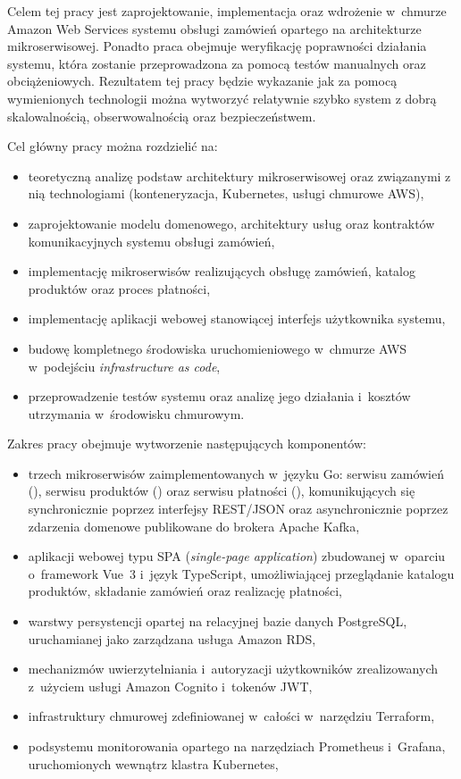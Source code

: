 Celem tej pracy jest zaprojektowanie, implementacja oraz wdrożenie w~chmurze Amazon Web Services systemu obsługi
zamówień opartego na architekturze mikroserwisowej. Ponadto praca obejmuje weryfikację
poprawności działania systemu, która zostanie przeprowadzona za pomocą testów manualnych oraz obciążeniowych. Rezultatem tej pracy będzie wykazanie jak za pomocą wymienionych technologii
można wytworzyć relatywnie szybko system z dobrą skalowalnością, obserwowalnością oraz bezpieczeństwem.

Cel główny pracy można rozdzielić na:

\begin{itemize}
    \item teoretyczną analizę podstaw architektury mikroserwisowej oraz związanymi z nią technologiami (konteneryzacja, Kubernetes, usługi chmurowe AWS),
    \item zaprojektowanie modelu domenowego, architektury usług oraz kontraktów komunikacyjnych systemu obsługi zamówień, 
    \item implementację mikroserwisów realizujących obsługę zamówień, katalog produktów oraz proces płatności,
    \item implementację aplikacji webowej stanowiącej interfejs użytkownika systemu,
    \item budowę kompletnego środowiska uruchomieniowego w~chmurze AWS w~podejściu \emph{infrastructure as code},
    \item przeprowadzenie testów systemu oraz analizę jego działania i~kosztów utrzymania w~środowisku chmurowym.
\end{itemize}

Zakres pracy obejmuje wytworzenie następujących komponentów:

\begin{itemize}
    \item trzech mikroserwisów zaimplementowanych w~języku Go: serwisu zamówień (), serwisu 
    produktów () oraz serwisu płatności (), komunikujących 
    się synchronicznie poprzez interfejsy REST/JSON oraz asynchronicznie poprzez zdarzenia domenowe publikowane do brokera Apache Kafka,
    \item aplikacji webowej typu SPA (\emph{single-page application}) zbudowanej w~oparciu o~framework Vue~3 i~język TypeScript, 
    umożliwiającej przeglądanie katalogu produktów, składanie zamówień oraz realizację płatności,
    \item warstwy persystencji opartej na relacyjnej bazie danych PostgreSQL, uruchamianej jako zarządzana usługa Amazon RDS,
    \item mechanizmów uwierzytelniania i~autoryzacji użytkowników zrealizowanych z~użyciem usługi Amazon Cognito i~tokenów JWT,
    \item infrastruktury chmurowej zdefiniowanej w~całości w~narzędziu Terraform,
    \item podsystemu monitorowania opartego na narzędziach Prometheus i~Grafana, uruchomionych wewnątrz klastra Kubernetes,
\end{itemize}

